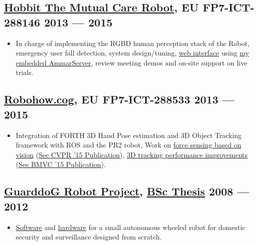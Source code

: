 \documentclass[a4,8pt]{article}
\newenvironment{zitemize}{
\begin{itemize}\itemsep0pt \parskip0pt \parsep1pt}
{\end{itemize}\vspace{-0.5cm}}
\begin{document}
\subsection*{\href{http://hobbit.acin.tuwien.ac.at/}{Hobbit The Mutual Care Robot}, {\normalsize\normalfont EU FP7-ICT-288146} \hfill 2013 --- 2015} 
    \begin{zitemize}
        \item In charge of implementing the RGBD human perception stack of the Robot, emergency user fall detection, system design/tuning, \href{https://www.youtube.com/watch?v=41_8ktacxt8}{web interface} using \href{https://github.com/AmmarkoV/AmmarServer/}{my embedded AmmarServer}, review meeting demos and on-site support on live trials. 
    \end{zitemize}

\subsection*{\href{https://cordis.europa.eu/docs/projects/cnect/3/288533/080/deliverables/001-d21.pdf}{Robohow.cog}, {\normalsize\normalfont EU FP7-ICT-288533} \hfill 2013 --- 2015} 
    \begin{zitemize}
        \item Integration of FORTH 3D Hand Pose estimation and 3D Object Tracking framework with ROS and the PR2 robot, Work on \href{https://www.youtube.com/watch?v=C4k-FPWM1t0}{force sensing based on vision} (\href{http://users.ics.forth.gr/~argyros/mypapers/2015_06_CVPR_fsv.pdf}{See CVPR '15 Publication}), \href{https://www.youtube.com/watch?v=nPru6PpWrK4}{3D tracking performance improvements} (\href{http://users.ics.forth.gr/~argyros/mypapers/2015_09_BMVC_fect.pdf}{See BMVC '15 Publication}).
    \end{zitemize}

\subsection*{\href{https://github.com/AmmarkoV/RoboVision}{GuarddoG Robot Project}, {\normalsize\normalfont \href{https://github.com/AmmarkoV/RoboVision/blob/master/Documentation/GuarDDoG_RoboVision.pdf}{BSc Thesis}} \hfill 2008 --- 2012} 
    \begin{zitemize}
        \item \href{https://github.com/AmmarkoV/RoboVision}{Software} and \href{https://github.com/AmmarkoV/RoboVision/blob/master/Documentation/GuarDDoG_RoboVision.pdf}{hardware} for a small autonomous wheeled robot for domestic security and surveillance designed from scratch.
    \end{zitemize}
\end{document}
